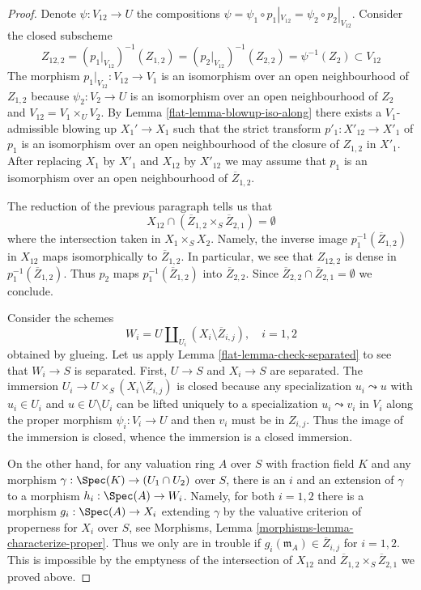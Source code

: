 \begin{proof}
\medskip\noindent
Denote $\psi : V_{12} \to U$ the compositions
$\psi = \psi_1 \circ p_1|_{V_{12}} = \psi_2 \circ p_2|_{V_{12}}$.
Consider the closed subscheme
$$
Z_{12, 2} =
(p_1|_{V_{12}})^{-1}(Z_{1, 2}) =
(p_2|_{V_{12}})^{-1}(Z_{2, 2}) =
\psi^{-1}(Z_2) \subset V_{12}
$$
The morphism $p_1|_{V_{12}} : V_{12} \to V_1$ is an isomorphism
over an open neighbourhood of $Z_{1, 2}$ because $\psi_2 : V_2 \to U$
is an isomorphism over an open neighbourhood of $Z_2$ and
$V_{12} = V_1 \times_U V_2$.
By Lemma \ref{flat-lemma-blowup-iso-along}
there exists a $V_1$-admissible blowing up $X_1' \to X_1$
such that the strict transform $p'_1 : X'_{12} \to X'_1$
of $p_1$ is an isomorphism over an open neighbourhood of
the closure of $Z_{1, 2}$ in $X'_1$.
After replacing $X_1$ by $X'_1$ and $X_{12}$ by $X'_{12}$
we may assume that $p_1$ is an isomorphism over an open
neighbourhood of $\overline{Z}_{1, 2}$.

\medskip\noindent
The reduction of the previous paragraph tells us that
$$
X_{12} \cap (\overline{Z}_{1, 2} \times_S \overline{Z}_{2, 1}) = \emptyset
$$
where the intersection taken in $X_1 \times_S X_2$. Namely, the inverse
image $p_1^{-1}(\overline{Z}_{1, 2})$ in $X_{12}$ maps isomorphically
to $\overline{Z}_{1, 2}$. In particular, we see that $Z_{12, 2}$
is dense in $p_1^{-1}(\overline{Z}_{1, 2})$. Thus $p_2$ maps
$p_1^{-1}(\overline{Z}_{1, 2})$ into $\overline{Z}_{2, 2}$.
Since $\overline{Z}_{2, 2} \cap \overline{Z}_{2, 1} = \emptyset$
we conclude.

\medskip\noindent
Consider the schemes
$$
W_i = U \coprod\nolimits_{U_i} (X_i \setminus \overline{Z}_{i, j}),
\quad i = 1, 2
$$
obtained by glueing. Let us apply Lemma \ref{flat-lemma-check-separated}
to see that $W_i \to S$ is separated. First,
$U \to S$ and $X_i \to S$ are separated. The immersion
$U_i \to U \times_S (X_i \setminus \overline{Z}_{i, j})$
is closed because any specialization $u_i \leadsto u$
with $u_i \in U_i$ and $u \in U \setminus U_i$
can be lifted uniquely to a specialization
$u_i \leadsto v_i$ in $V_i$ along the proper morphism
$\psi_i : V_i \to U$ and then $v_i$ must be in $Z_{i, j}$.
Thus the image of the immersion is closed, whence the immersion
is a closed immersion.

\medskip\noindent
On the other hand, for any valuation ring $A$ over $S$ with fraction field $K$
and any morphism $\gamma : \Spec(K) \to (U_1 \cap U_2)$ over $S$, there
is an $i$ and an extension of $\gamma$ to a morphism $h_i : \Spec(A) \to W_i$.
Namely, for both $i = 1, 2$ there is a morphism
$g_i : \Spec(A) \to X_i$ extending $\gamma$ by the
valuative criterion of properness for $X_i$ over $S$, see
Morphisms, Lemma \ref{morphisms-lemma-characterize-proper}.
Thus we only are in trouble
if $g_i(\mathfrak m_A) \in \overline{Z}_{i, j}$ for $i = 1, 2$. This is
impossible by the emptyness of the intersection of $X_{12}$ and
$\overline{Z}_{1, 2} \times_S \overline{Z}_{2, 1}$ we proved above.


\end{proof}
